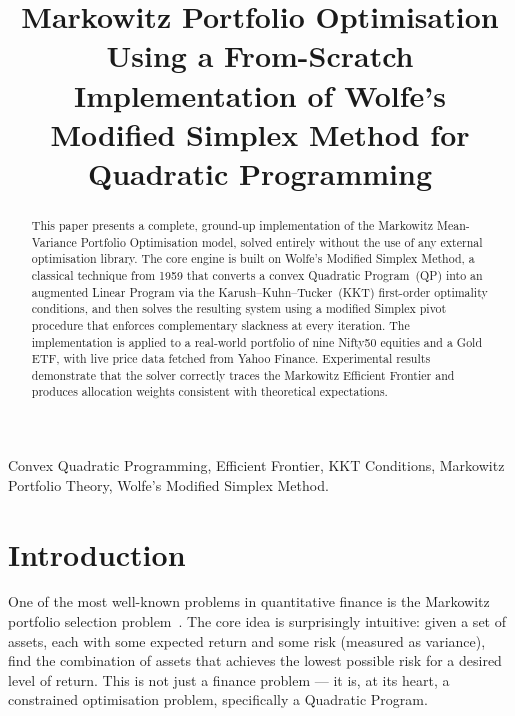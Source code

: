 \documentclass[conference]{IEEEtran}
\begin{document}
\title{Markowitz Portfolio Optimisation Using a From-Scratch Implementation
of Wolfe's Modified Simplex Method for Quadratic Programming}

\author{
}

\maketitle

\begin{abstract}
This paper presents a complete, ground-up implementation of the Markowitz
Mean-Variance Portfolio Optimisation model, solved entirely without the use
of any external optimisation library. The core engine is built on Wolfe's
Modified Simplex Method, a classical technique from 1959 that converts a
convex Quadratic Program~(QP) into an augmented Linear Program via the
Karush--Kuhn--Tucker~(KKT) first-order optimality conditions, and then
solves the resulting system using a modified Simplex pivot procedure that
enforces complementary slackness at every iteration. The implementation is
applied to a real-world portfolio of nine Nifty50 equities and a Gold ETF,
with live price data fetched from Yahoo Finance. Experimental results
demonstrate that the solver correctly traces the Markowitz Efficient Frontier
and produces allocation weights consistent with theoretical expectations.
\end{abstract}

\begin{IEEEkeywords}
Convex Quadratic Programming, Efficient Frontier, KKT Conditions,
Markowitz Portfolio Theory, Wolfe's Modified Simplex Method.
\end{IEEEkeywords}

\section{Introduction}

One of the most well-known problems in quantitative finance is the Markowitz
portfolio selection problem~\cite{markowitz1952}. The core idea is
surprisingly intuitive: given a set of assets, each with some expected return
and some risk (measured as variance), find the combination of assets that
achieves the lowest possible risk for a desired level of return. This is not
just a finance problem --- it is, at its heart, a constrained optimisation
problem, specifically a Quadratic Program.
\end{document}
